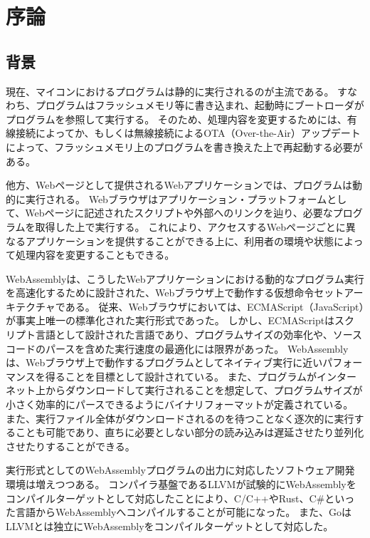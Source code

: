 \chapter{序論}
\label{chap:introduction}

\section{背景}
\label{section:background}


現在、マイコンにおけるプログラムは静的に実行されるのが主流である。
すなわち、プログラムはフラッシュメモリ等に書き込まれ、起動時にブートローダがプログラムを参照して実行する。
そのため、処理内容を変更するためには、有線接続によってか、もしくは無線接続によるOTA（Over-the-Air）アップデートによって、フラッシュメモリ上のプログラムを書き換えた上で再起動する必要がある。

他方、Webページとして提供されるWebアプリケーションでは、プログラムは動的に実行される。
Webブラウザはアプリケーション・プラットフォームとして、Webページに記述されたスクリプトや外部へのリンクを辿り、必要なプログラムを取得した上で実行する。
これにより、アクセスするWebページごとに異なるアプリケーションを提供することができる上に、利用者の環境や状態によって処理内容を変更することもできる。

WebAssemblyは、こうしたWebアプリケーションにおける動的なプログラム実行を高速化するために設計された、Webブラウザ上で動作する仮想命令セットアーキテクチャである。
従来、Webブラウザにおいては、ECMAScript（JavaScript）が事実上唯一の標準化された実行形式であった。
しかし、ECMAScriptはスクリプト言語として設計された言語であり\cite{ecma2018}、プログラムサイズの効率化や、ソースコードのパースを含めた実行速度の最適化には限界があった。
WebAssemblyは、Webブラウザ上で動作するプログラムとしてネイティブ実行に近いパフォーマンスを得ることを目標として設計されている。
また、プログラムがインターネット上からダウンロードして実行されることを想定して、プログラムサイズが小さく効率的にパースできるようにバイナリフォーマットが定義されている。
また、実行ファイル全体がダウンロードされるのを待つことなく逐次的に実行することも可能であり、直ちに必要としない部分の読み込みは遅延させたり並列化させたりすることができる。

実行形式としてのWebAssemblyプログラムの出力に対応したソフトウェア開発環境は増えつつある。
コンパイラ基盤であるLLVMが試験的にWebAssemblyをコンパイルターゲットとして対応したことにより、C/C++やRust\cite{rust_wasm}、C\#\cite{mono_wasm}といった言語からWebAssemblyへコンパイルすることが可能になった。
また、GoはLLVMとは独立にWebAssemblyをコンパイルターゲットとして対応した\cite{go_wasm}。

